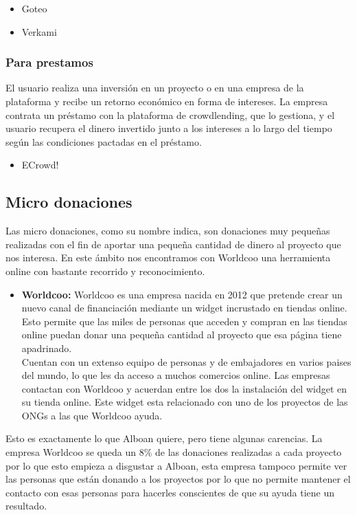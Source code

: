 \begin{itemize}
	\item Goteo
	\item Verkami
\end{itemize}
		
\subsubsection{Para prestamos}
El usuario realiza una inversión en un proyecto o en una empresa de la plataforma y recibe un retorno económico en forma de intereses. La empresa contrata un préstamo con la plataforma de crowdlending, que lo gestiona, y el usuario recupera el dinero invertido junto a los intereses a lo largo del tiempo según las condiciones pactadas en el préstamo.
		
\begin{itemize}
	\item ECrowd!
\end{itemize}
			
\subsection{Micro donaciones}
Las micro donaciones, como su nombre indica, son donaciones muy pequeñas realizadas con el fin de aportar una pequeña cantidad de dinero al proyecto que nos interesa. En este ámbito nos encontramos con Worldcoo una herramienta online con bastante recorrido y reconocimiento.
			
\begin{itemize}
	\item \textbf{Worldcoo:} \smallbreak
	Worldcoo es una empresa nacida en 2012 que pretende crear un nuevo canal de financiación mediante un widget incrustado en tiendas online. Esto permite que las miles de personas que acceden y compran en las tiendas online puedan donar una pequeña cantidad al proyecto que esa página tiene apadrinado.\\
	
	Cuentan con un extenso equipo de personas y de embajadores en varios paises del mundo, lo que les da acceso a muchos comercios online. Las empresas contactan con Worldcoo y acuerdan entre los dos la instalación del widget en su tienda online. Este widget esta relacionado con uno de los proyectos de las ONGs a las que Worldcoo ayuda.
\end{itemize}
				
Esto es exactamente lo que Alboan quiere, pero tiene algunas carencias. La empresa Worldcoo se queda un 8\% de las donaciones realizadas a cada proyecto por lo que esto empieza a disgustar a Alboan, esta empresa tampoco permite ver las personas que están donando a los proyectos por lo que no permite mantener el contacto con esas personas para hacerles conscientes de que su ayuda tiene un resultado. \\

